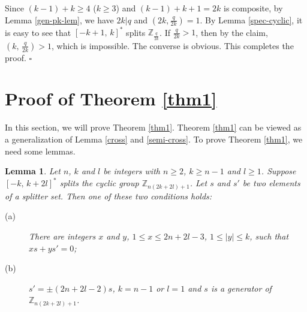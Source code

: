 \documentclass[12pt]{article}
\newtheorem{lem}{Lemma}[section]
\newtheorem{open problem}{Open problem}[section]
\newcommand{\qed}{\nopagebreak\hspace*{\fill}$\square$\par\vskip2mm}
\begin{document}
Since $(k-1)+k\geq 4$ ($k\geq 3$) and $(k-1)+k+1=2k$ is composite, by Lemma \ref{gen-pk-lem},
we have $2k|q$ and $(2k, \frac{q}{2k}) = 1$.
By Lemma \ref{spec-cyclic}, it is easy to see that $[-k+1, \,k]^*$ splits $\mathbb{Z}_{\frac{q}{2k}}$.
If $\frac{q}{2k}>1$, then by the claim, $(k, \,\frac{q}{2k})>1$, which is impossible.
The converse is obvious. This completes the proof.
\qed


\section{Proof of Theorem \ref{thm1}}

In this section, we will prove Theorem \ref{thm1}. Theorem \ref{thm1} can be viewed as a generalization of
Lemma \ref{cross} and \ref{semi-cross}.
To prove Theorem \ref{thm1}, we need some lemmas.

\begin{lem} \label{Elemmid}
Let $n$, $k$ and $l$ be integers with $n\geq 2$, $k\geq n-1$ and $l\geq 1$.
Suppose  $[-k, \,k+2l]^\ast$ splits the cyclic group $\mathbb{Z}_{n(2k+2l)+1}$.
Let $s$ and $s'$ be two elements of a splitter set.
Then one of these two conditions holds:
\begin{description}
  \item[(a)] There are integers $x$ and $y$, $1\leq x\leq 2n+2l-3$, $1\leq |y|\leq k$, such that $xs+ys'=0$;
  \item[(b)] $s'=\pm(2n+2l-2)s$, $k=n-1$ or $l=1$ and $s$ is a generator of $\mathbb{Z}_{n(2k+2l)+1}$.
\end{description}
\end{lem}
\end{document}
